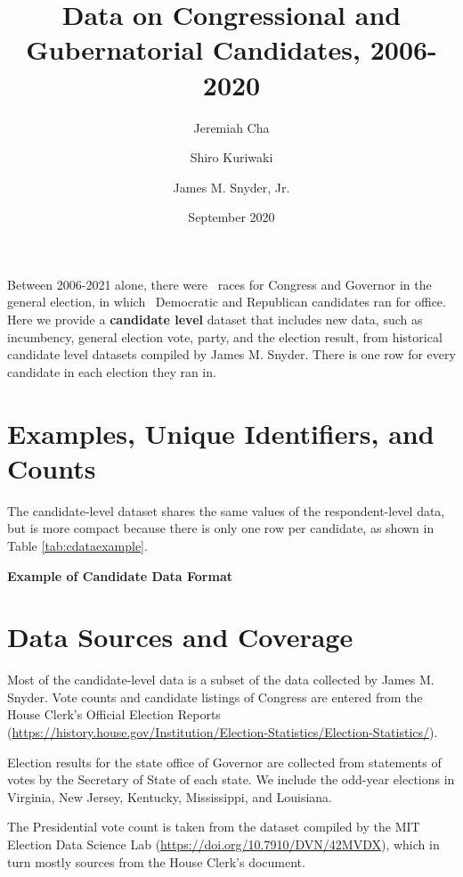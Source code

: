 \documentclass[12pt]{article}
\title{\large\textbf{Data on Congressional and Gubernatorial Candidates, 2006-2020}}
\author[1]{\normalsize Jeremiah Cha}
\author[2]{\normalsize Shiro Kuriwaki}
\author[1]{\normalsize James M. Snyder, Jr.}
\affil[1]{\footnotesize Department of Government, Harvard University.}
\affil[2]{\footnotesize To be Department of Political Science, Yale University}
\date{\normalsize September 2020}
\begin{document}
\maketitle 

Between 2006-2021 alone, there were \unskip \ races for Congress and Governor in the general election, in which \unskip \ Democratic and Republican candidates ran for office.  Here we provide a \textbf{candidate level} dataset that includes new data, such as incumbency, general election vote, party, and the election result, from historical candidate level datasets compiled by James M. Snyder. There is one row for every candidate in each election they ran in. 


\section{Examples, Unique Identifiers, and Counts}

The candidate-level dataset shares the same values of the respondent-level data, but is more compact because there is only one row per candidate, as shown in Table \ref{tab:cdataexample}.

\begin{table}[!h]
\caption{\textbf{Example of Candidate Data Format} \label{tab:cdataexample}}
\centering
\footnotesize

\end{table}

\section{Data Sources and Coverage}

Most of the candidate-level data is a subset of the data collected by James M. Snyder. Vote counts and candidate listings of Congress are entered from the House Clerk's Official Election Reports (\url{https://history.house.gov/Institution/Election-Statistics/Election-Statistics/}).  

Election results for the state office of Governor are collected from statements of votes by the Secretary of State of each state. We include the odd-year elections in Virginia, New Jersey, Kentucky, Mississippi, and Louisiana.

The Presidential vote count is taken from the dataset compiled by the MIT Election Data Science Lab (\url{https://doi.org/10.7910/DVN/42MVDX}), which in turn mostly sources from the House Clerk's document.
\end{document}
